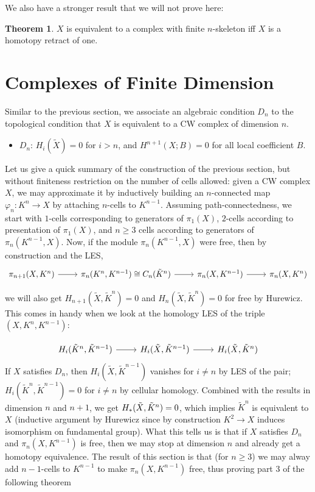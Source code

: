 \documentclass{article}
\theoremstyle{definition}
\newtheorem{theorem}{Theorem}[section]
\theoremstyle{definition}
\theoremstyle{definition}
\theoremstyle{definition}
\theoremstyle{definition}
\theoremstyle{definition}
\theoremstyle{definition}
\begin{document}
We also have a stronger result that we will not prove here:
\begin{tcolorbox}[colback=red!5!white,colframe=red!30!white]
\begin{theorem}
$X$ is equivalent to a complex with finite $n$-skeleton iff $X$ is a homotopy retract of one.
\end{theorem}
\end{tcolorbox}


\section{Complexes of Finite Dimension}



Similar to the previous section, we associate an algebraic condition $D_n$ to the topological condition that $X$ is equivalent to a CW complex of dimension $n$.

\begin{itemize}
  \item $D_n$: $H_i(\tilde{X})=0$ for $i>n$, and $H^{n+1}(X;B)=0$ for all local coefficient $B$. 
\end{itemize}

Let us give a quick summary of the construction of the previous section, but without finiteness restriction on the number of cells allowed: given a CW complex $X$, we may approximate it by inductively building an $n$-connected map $\varphi_n: K^n\to X$ by attaching $n$-cells to $K^{n-1}$. Assuming path-connectedness, we start with $1$-cells corresponding to generators of $\pi_1(X)$, $2$-cells according to presentation of $\pi_1(X)$, and $n\geq 3$ cells according to generators of $\pi_n(K^{n-1},X)$. Now, if the module $\pi_n(K^{n-1},X)$ were free, then by construction and the LES,
\[\begin{tikzcd}
  \pi_{n+1}(X,K^{n})\arrow[r]&\pi_n(K^n,K^{n-1})\cong C_n(\tilde{K}^n)\arrow[r]&\pi_n(X,K^{n-1})\arrow[r]&\pi_n(X,K^n)
  \end{tikzcd}\]

we will also get $H_{n+1}(\tilde{X},\tilde{K}^{n})=0$ and $H_{n}(\tilde{X},\tilde{K}^{n})=0$ for free by Hurewicz. This comes in handy when we look at the homology LES of the triple $(X,K^{n},K^{n-1})$:

\[
  \begin{tikzcd}
  H_i(\tilde{K}^n,\tilde{K}^{n-1})\arrow[r]&H_i(\tilde{X},\tilde{K}^{n-1})\arrow[r]&H_i(\tilde{X},\Tilde{K}^n)
\end{tikzcd}
\]
If $X$ satisfies $D_n$, then $H_i(\tilde{X},\tilde{K}^{n-1})$ vanishes for $i\neq n$ by LES of the pair; $H_i(\tilde{K}^n,\tilde{K}^{n-1})=0$ for $i\neq n$ by cellular homology. Combined with the results in dimension $n$ and $n+1$, we get $H_*(\tilde{X},\Tilde{K}^n)=0$, which implies $\tilde{K}^n$ is equivalent to $X$ (inductive argument by Hurewicz since by construction $K^2\to X$ induces isomorphism on fundamental group). What this tells us is that if $X$ satisfies $D_n$ and $\pi_n(X,K^{n-1})$ is free, then we may stop at dimension $n$ and already get a homotopy equivalence. The result of this section is that (for $n\geq 3$) we may alway add $n-1$-cells to $K^{n-1}$ to make $\pi_n(X,K^{n-1})$ free, thus proving part $3$ of the following theorem
\end{document}
